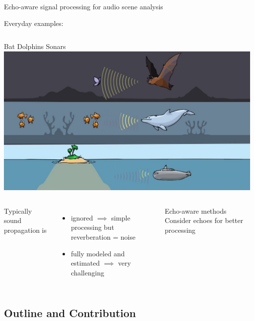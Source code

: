 \begin{frame}[t]{\alert{Echo-aware} signal processing for audio scene analysis}
\begin{block}{Everyday examples:}
        \vspace*{2mm}
        \begin{columns}[T,onlytextwidth]
            Bat
            Dolphins
            Sonars
            \includegraphics[width=\textwidth]{figures/echo_nature.jpg}
        \end{columns}
    \end{block}


    \begin{columns}
        Typically sound propagation is
        \begin{itemize}
            \item ignored $\implies$ simple processing but reverberation = noise
            \item fully modeled and estimated $\implies$ very challenging
        \end{itemize}

        \begin{mydefblock}{Echo-aware methods}
            Consider echoes for better processing
        \end{mydefblock}
    \end{columns}

\end{frame}

\subsection*{Outline and Contribution}

